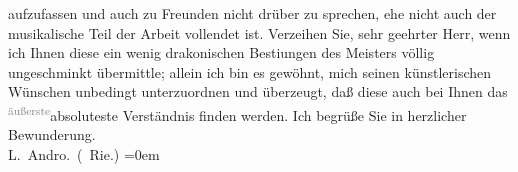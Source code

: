 \begin{ledgroupsized}[t]{13cm}
                    aufzufassen und auch zu Freunden nicht drüber zu sprechen, ehe nicht auch der
                    musikalische Teil der Arbeit vollendet ist.\pend
           \pstart
           Verzeihen Sie, sehr geehrter Herr, wenn ich Ihnen diese ein wenig drakonischen
                        Besti{\geminationm}ungen des Meisters völlig ungeschminkt übermittle; allein ich
                    bin es gewöhnt, mich seinen künstlerischen Wünschen unbedingt unterzuordnen und
                    überzeugt, daß diese auch bei Ihnen das {\pb}\substVorne{}\textsuperscript{\textcolor{gray}{äußerste}}{\allowbreak}\substDazwischen{}absoluteste\substHinten{} Verständnis finden werden.\pend
           \pstart
           Ich begrüße Sie in herzlicher Bewunderung.{\\[\baselineskip]}\spacefill\mbox{L. Andro. (\label{K_L02569-1v}\label{K_L02569-1h} Rie.)}\pend
           \leftskip=0em{}
         
         \endnumbering{}\end{ledgroupsized}  \newcommand{\dateiname}{L02569}\newcommand{\titel}{Therese Rie-Andro an Arthur Schnitzler, 6. 2. 1912}\newcommand{\editorInnen}{Martin Anton Müller und Gerd-Hermann Susen}
      